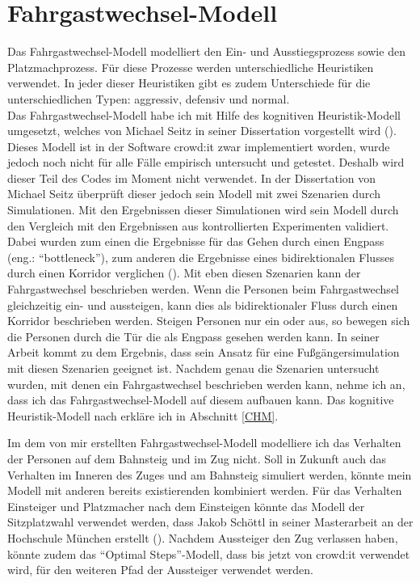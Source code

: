 \section{Fahrgastwechsel-Modell} \label{Fahrgastwechsel-Modell}
Das Fahrgastwechsel-Modell modelliert den Ein- und Ausstiegsprozess sowie den Platzmachprozess. Für diese Prozesse werden unterschiedliche Heuristiken verwendet. In jeder dieser Heuristiken gibt es zudem Unterschiede für die unterschiedlichen Typen: aggressiv, defensiv und normal. \\
Das Fahrgastwechsel-Modell habe ich mit Hilfe des kognitiven Heuristik-Modell umgesetzt, welches von Michael Seitz in seiner Dissertation vorgestellt wird (\cite{Seitz.2016}). Dieses Modell ist in der Software crowd:it zwar implementiert worden, wurde jedoch noch nicht für alle Fälle empirisch untersucht und getestet. Deshalb wird dieser Teil des Codes im Moment nicht verwendet. In der Dissertation von Michael Seitz überprüft dieser jedoch sein Modell mit zwei Szenarien durch Simulationen. Mit den Ergebnissen dieser Simulationen wird sein Modell durch den Vergleich mit den Ergebnissen aus kontrollierten Experimenten validiert. Dabei wurden zum einen die Ergebnisse für das Gehen durch einen Engpass (eng.: "`bottleneck"'), zum anderen die Ergebnisse eines bidirektionalen Flusses durch einen Korridor verglichen (\cite{Seitz.2016}). Mit eben diesen Szenarien kann der Fahrgastwechsel beschrieben werden. Wenn die Personen beim Fahrgastwechsel gleichzeitig ein- und aussteigen, kann dies als bidirektionaler Fluss durch einen Korridor beschrieben werden. Steigen Personen nur ein oder aus, so bewegen sich die Personen durch die Tür die als Engpass gesehen werden kann. In seiner Arbeit kommt \cite{Seitz.2016} zu dem Ergebnis, dass sein Ansatz für eine Fußgängersimulation mit diesen Szenarien geeignet ist. Nachdem genau die Szenarien untersucht wurden, mit denen ein Fahrgastwechsel beschrieben werden kann, nehme ich an, dass ich das Fahrgastwechsel-Modell auf diesem aufbauen kann. Das kognitive Heuristik-Modell nach \cite{Seitz.2016} erkläre ich in Abschnitt \ref{CHM}.

Im dem von mir erstellten Fahrgastwechsel-Modell modelliere ich das Verhalten der Personen auf dem Bahnsteig und im Zug nicht. Soll in Zukunft auch das Verhalten im Inneren des Zuges und am Bahnsteig simuliert werden, könnte mein Modell mit anderen bereits existierenden kombiniert werden. Für das Verhalten Einsteiger und Platzmacher nach dem Einsteigen könnte das Modell der Sitzplatzwahl verwendet werden, dass Jakob Schöttl in seiner Masterarbeit an der Hochschule München erstellt (\cite{Schottl.2016}). Nachdem Aussteiger den Zug verlassen haben, könnte zudem  das "`Optimal Steps"'-Modell, dass bis jetzt von crowd:it verwendet wird, für den weiteren Pfad der Aussteiger verwendet werden.
